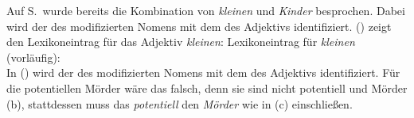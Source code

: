 Auf S.\,\pageref{page-kleinen-Kinder} wurde bereits die Kombination von \emph{kleinen} und
\emph{Kinder} besprochen. Dabei wird der \ltopw des modifizierten Nomens mit dem \ltopw des
Adjektivs identifiziert. () zeigt den Lexikoneintrag für das Adjektiv \emph{kleinen}:
\eas
\label{le-kleinen-vorläufig}%
Lexikoneintrag für \emph{kleinen} (vorläufig):\\
\zs
In () wird der \ltopw des modifizierten Nomens mit dem \ltopw des Adjektivs
identifiziert. Für die potentiellen Mörder wäre das falsch, denn sie sind nicht potentiell und
Mörder (b), stattdessen muss das \emph{potentiell} den \emph{Mörder} wie in (c) einschließen.
\eal
\ex {}
\ex {}
\ex\label{mrs-potentielle-Mörder}
\zl

